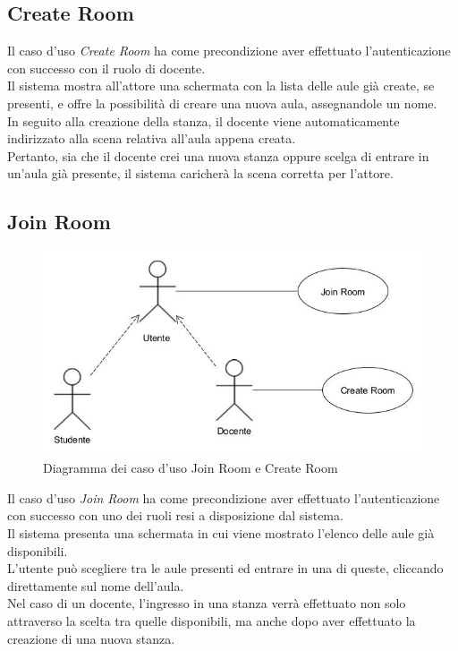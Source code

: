 \subsection{Create Room}
Il caso d'uso \textit{Create Room} ha come precondizione aver effettuato l'autenticazione con successo con il ruolo di docente.
\\Il sistema mostra all'attore una schermata con la lista delle aule già create, se presenti, e offre la possibilità di creare una nuova aula, assegnandole un nome. \\In seguito alla creazione della stanza, il docente viene automaticamente indirizzato alla scena relativa all'aula appena creata.\\Pertanto, sia che il docente crei una nuova stanza oppure scelga di entrare in un'aula già presente, il sistema caricherà la scena corretta per l'attore.
\subsection{Join Room}
\begin{figure}[H]
    \centering
    \includegraphics[scale=0.6]{Immagini/CreateJoinRoomUseCase.jpg}
    \caption{Diagramma dei caso d'uso Join Room e Create Room}
    \label{fig:my_label}
\end{figure}
Il caso d'uso \textit{Join Room} ha come precondizione aver effettuato l'autenticazione con successo con uno dei ruoli resi a disposizione dal sistema.
\\Il sistema presenta una schermata in cui viene mostrato l'elenco delle aule già disponibili. \\L'utente può scegliere tra le aule presenti ed entrare in una di queste, cliccando direttamente sul nome dell'aula.
\\Nel caso di un docente, l'ingresso in una stanza verrà effettuato non solo attraverso la scelta tra quelle disponibili, ma anche dopo aver effettuato la creazione di una nuova stanza.
